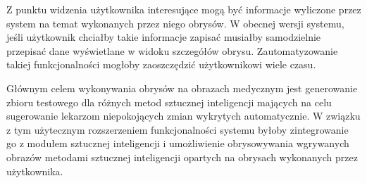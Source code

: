 \documentclass[a4paper,11pt,twoside,openright]{report}
\theoremstyle{definition}
\begin{document}
Z punktu widzenia użytkownika interesujące mogą być informacje wyliczone przez
system na temat wykonanych przez niego obrysów. W obecnej wersji systemu, jeśli
użytkownik chciałby takie informacje zapisać musiałby samodzielnie przepisać dane
wyświetlane w widoku szczegółów obrysu. Zautomatyzowanie takiej funkcjonalności
mogłoby zaoszczędzić użytkownikowi wiele czasu.

Głównym celem wykonywania obrysów na obrazach medycznym jest generowanie zbioru
testowego dla różnych metod sztucznej inteligencji mających na celu sugerowanie
lekarzom niepokojących zmian wykrytych automatycznie. W związku z tym użytecznym
rozszerzeniem funkcjonalności systemu byłoby zintegrowanie go z modułem sztucznej
inteligencji i umożliwienie obrysowywania wgrywanych obrazów metodami sztucznej
inteligencji opartych na obrysach wykonanych przez użytkownika.




\end{document}
